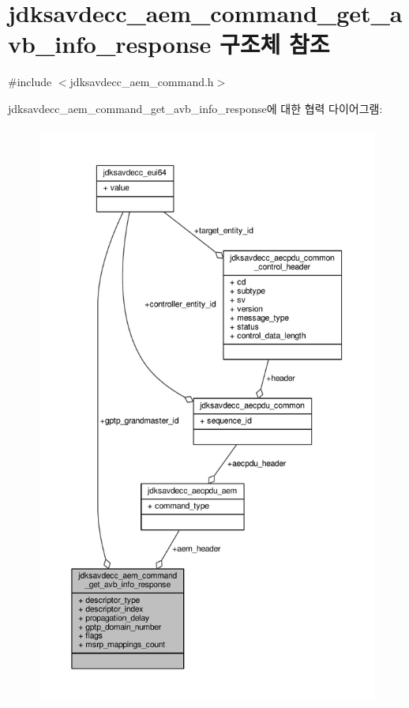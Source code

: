 \hypertarget{structjdksavdecc__aem__command__get__avb__info__response}{}\section{jdksavdecc\+\_\+aem\+\_\+command\+\_\+get\+\_\+avb\+\_\+info\+\_\+response 구조체 참조}
\label{structjdksavdecc__aem__command__get__avb__info__response}


{\ttfamily \#include $<$jdksavdecc\+\_\+aem\+\_\+command.\+h$>$}



jdksavdecc\+\_\+aem\+\_\+command\+\_\+get\+\_\+avb\+\_\+info\+\_\+response에 대한 협력 다이어그램\+:
\nopagebreak
\begin{figure}[H]
\begin{center}
\leavevmode
\includegraphics[height=550pt]{structjdksavdecc__aem__command__get__avb__info__response__coll__graph}
\end{center}
\end{figure}

